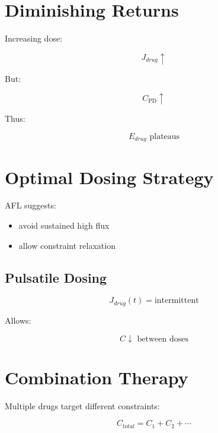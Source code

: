 \documentclass[11pt]{article}
\begin{document}
\section{Diminishing Returns}

Increasing dose:

\begin{equation}
J_{drug} \uparrow
\end{equation}

But:

\begin{equation}
C_{\mathrm{PD}} \uparrow
\end{equation}

Thus:

\begin{equation}
E_{drug} \text{ plateaus}
\end{equation}

\section{Optimal Dosing Strategy}

AFL suggests:

\begin{itemize}
    \item avoid sustained high flux
    \item allow constraint relaxation
\end{itemize}

\subsection{Pulsatile Dosing}

\begin{equation}
J_{drug}(t) = \text{intermittent}
\end{equation}

Allows:

\begin{equation}
C \downarrow \text{ between doses}
\end{equation}

\section{Combination Therapy}

Multiple drugs target different constraints:

\begin{equation}
C_{total} = C_1 + C_2 + \cdots
\end{equation}
\end{document}
